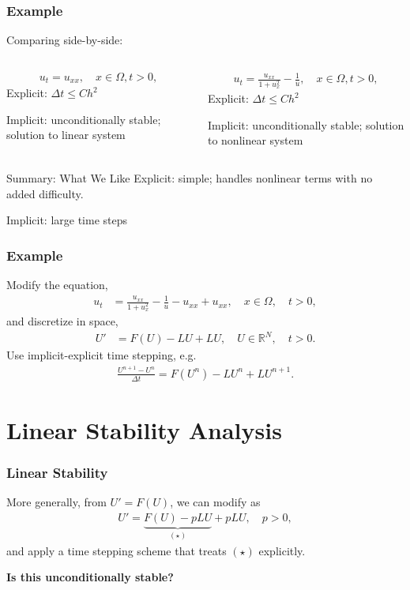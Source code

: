 \documentclass[hyperref={pdfpagelabels=false}]{beamer}
\begin{document}
\begin{frame}
	\frametitle{Example}
Comparing side-by-side:
	\begin{columns}
\begin{column}{0.48\textwidth}
	\begin{align*} 
		u_t = u_{xx}, \quad x\in \Omega, t > 0,
	\end{align*}
Explicit: $\Delta t \leq Ch^2$

Implicit: unconditionally stable; solution to linear system
\end{column}
\begin{column}{0.48\textwidth}
	\begin{align*} 
		u_t = \frac{u_{xx}}{1 + u_x^2} - \frac{1}{u}, \quad x\in \Omega, t > 0,
	\end{align*}
Explicit: $\Delta t \leq Ch^2$

Implicit: unconditionally stable; solution to nonlinear system
\end{column}
	\end{columns}
	\begin{alertblock}{Summary: What We Like}
		Explicit: simple; handles nonlinear terms with no added difficulty.

		Implicit: large time steps
	\end{alertblock}
\end{frame}

\begin{frame}
	\frametitle{Example}
Modify the equation,
	\begin{align*}
		u_t &= \frac{u_{xx}}{1 + u_x^2} - \frac{1}{u} - u_{xx} + u_{xx}, \quad x\in \Omega, \quad t>0, 
	\end{align*}
and discretize in space,
	\begin{align*}
		U' &= F(U) - LU + LU, \quad U\in \mathbb{R}^N,\quad t > 0.
	\end{align*}
Use implicit-explicit time stepping, e.g.
	\begin{align*}
		\frac{U^{n+1} - U^n}{\Delta t} = F(U^n) - LU^n + LU^{n+1}.
	\end{align*}
\end{frame}

\section{Linear Stability Analysis} 
\begin{frame}
	\frametitle{Linear Stability}
More generally, from $U'=F(U)$, we can modify as 
	\begin{align*}
 		U' = \underbrace{F(U) - pLU}_{(\star)} + pLU, \quad p > 0,
	\end{align*}
and apply a time stepping scheme that treats $(\star)$ explicitly.

\vspace{5pt}
\textbf{Is this unconditionally stable?}
\end{frame}
\end{document}
